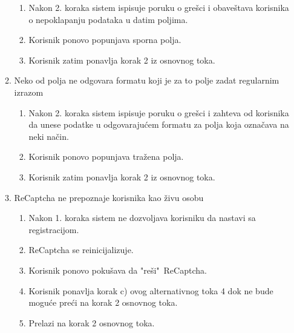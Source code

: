 \documentclass[a4paper]{article}
\begin{document}
\begin{itemize}
\begin{enumerate}
\begin{enumerate}
                    \item Nakon 2. koraka sistem ispisuje poruku o grešci i obaveštava korisnika o nepoklapanju podataka u datim poljima.
                    \item Korisnik ponovo popunjava sporna polja.
                    \item Korisnik zatim ponavlja korak 2 iz osnovnog toka.
                \end{enumerate}
            \item Neko od polja ne odgovara formatu koji je za to polje zadat regularnim izrazom
                \begin{enumerate}
                    \item Nakon 2. koraka sistem ispisuje poruku o grešci i zahteva od korisnika da unese podatke u odgovarajućem formatu za polja koja označava na neki način.
                    \item Korisnik ponovo popunjava tražena polja.
                    \item Korisnik zatim ponavlja korak 2 iz osnovnog toka.
                \end{enumerate}
            \item ReCaptcha ne prepoznaje korisnika kao živu osobu
                \begin{enumerate}
                    \item Nakon 1. koraka sistem ne dozvoljava korisniku da nastavi sa registracijom.
                    \item ReCaptcha se reinicijalizuje.
                    \item Korisnik ponovo pokušava da "reši"\ ReCaptcha.
                    \item Korisnik ponavlja korak c) ovog alternativnog toka 4 dok ne bude moguće preći na korak 2 osnovnog toka.
                    \item Prelazi na korak 2 osnovnog toka.
                \end{enumerate}
        \end{enumerate}
\end{itemize}
\end{document}
